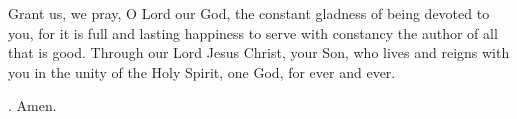 \lettrine[lines=3]{G}{}rant us, we pray, O Lord our God, the constant gladness of being devoted to you, for it is full and lasting happiness to serve with constancy the author of all that is good. Through our Lord Jesus Christ, your Son, who lives and reigns with you in the unity of the Holy Spirit, one God, for ever and ever. \par \Rbar. Amen.
